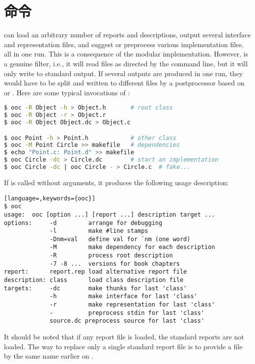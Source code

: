 \section{ 命令}
 can load an arbitrary number of reports and descriptions, output
several interface and representation files, and suggest or preprocess
various implementation files, all in one run. This is a consequence of the
modular implementation. However,  is a genuine filter, i.e., it
will read files as directed by the command line, but it will only write to
standard output. If several outputs are produced in one run, they would have
to be split and written to different files by a postprocessor based on
 or . Here are some typical invocations of
:

\begin{lstlisting}[language=sh,morekeywords={ooc}]
$ ooc -R Object -h > Object.h		# root class
$ ooc -R Object -r > Object.r
$ ooc -R Object Object.dc > Object.c

$ ooc Point -h > Point.h			# other class
$ ooc -M Point Circle >> makefile	# dependencies
$ echo "Point.c: Point.d" >> makefile
$ ooc Circle -dc > Circle.dc		# start an implementation
$ ooc Circle -dc | ooc Circle - > Circle.c	# fake...
\end{lstlisting}
If  is called without arguments, it produces the following usage
description:
\begin{lstlisting}[language=,keywords={ooc}]
$ ooc
usage:	ooc [option ...] [report ...] description target ...
options:	 -d			arrange for debugging
			 -l			make #line stamps
			 -Dnm=val	define val for `nm (one word)
			 -M			make dependency for each description
			 -R			process root description
			 -7 -8 ...	versions for book chapters
report:		 report.rep	load alternative report file
description: class		load class description file
targets:	 -dc		make thunks for last 'class'
			 -h			make interface for last 'class'
			 -r			make representation for last 'class'
			 -			preprocess stdin for last 'class'
			 source.dc preprocess source for last 'class'
\end{lstlisting}
It should be noted that if any report file is loaded, the standard reports
are not loaded. The way to replace only a single standard report file is to
provide a file by the same name earlier on .

